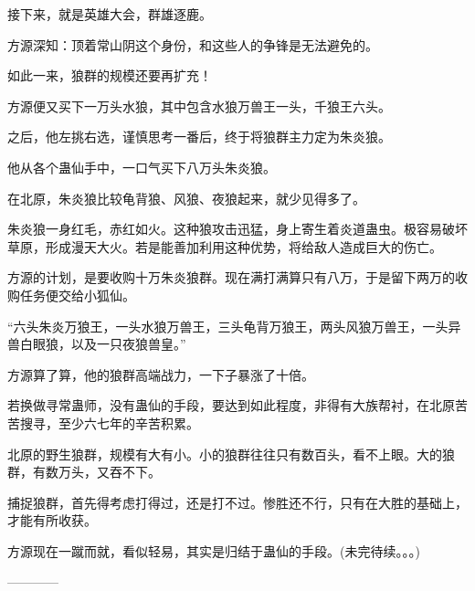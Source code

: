 \begin{this_body}
接下来，就是英雄大会，群雄逐鹿。

方源深知：顶着常山阴这个身份，和这些人的争锋是无法避免的。

如此一来，狼群的规模还要再扩充！

方源便又买下一万头水狼，其中包含水狼万兽王一头，千狼王六头。

之后，他左挑右选，谨慎思考一番后，终于将狼群主力定为朱炎狼。

他从各个蛊仙手中，一口气买下八万头朱炎狼。

在北原，朱炎狼比较龟背狼、风狼、夜狼起来，就少见得多了。

朱炎狼一身红毛，赤红如火。这种狼攻击迅猛，身上寄生着炎道蛊虫。极容易破坏草原，形成漫天大火。若是能善加利用这种优势，将给敌人造成巨大的伤亡。

方源的计划，是要收购十万朱炎狼群。现在满打满算只有八万，于是留下两万的收购任务便交给小狐仙。

“六头朱炎万狼王，一头水狼万兽王，三头龟背万狼王，两头风狼万兽王，一头异兽白眼狼，以及一只夜狼兽皇。”

方源算了算，他的狼群高端战力，一下子暴涨了十倍。

若换做寻常蛊师，没有蛊仙的手段，要达到如此程度，非得有大族帮衬，在北原苦苦搜寻，至少六七年的辛苦积累。

北原的野生狼群，规模有大有小。小的狼群往往只有数百头，看不上眼。大的狼群，有数万头，又吞不下。

捕捉狼群，首先得考虑打得过，还是打不过。惨胜还不行，只有在大胜的基础上，才能有所收获。

方源现在一蹴而就，看似轻易，其实是归结于蛊仙的手段。(未完待续。。。)

------------

\end{this_body}

